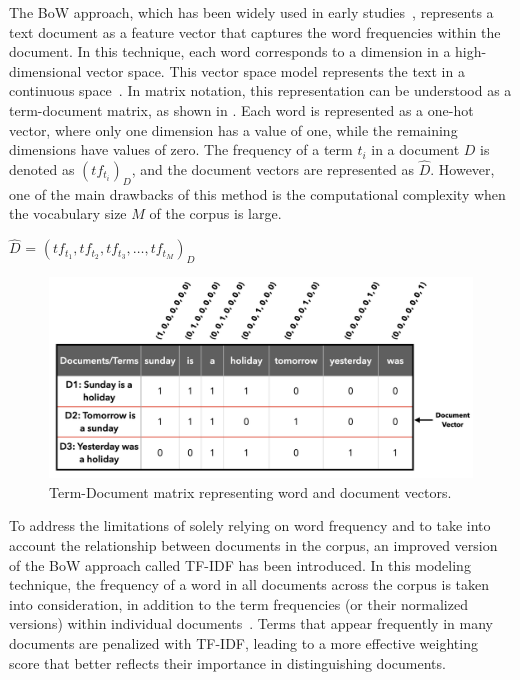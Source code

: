 The \ac{BoW} approach, which has been widely used in early studies~\cite{zhao2017fuzzy, qader2019overview}, represents a text document as a feature vector that captures the word frequencies within the document. In this technique, each word corresponds to a dimension in a high-dimensional vector space. This vector space model represents the text in a continuous space~\cite{afzali2019text}. In matrix notation, this representation can be understood as a term-document matrix, as shown in . Each word is represented as a one-hot vector, where only one dimension has a value of one, while the remaining dimensions have values of zero. The frequency of a term $t_i$ in a document $D$ is denoted as $(tf_{t_i})_D$, and the document vectors are represented as $\hat{D}$. However, one of the main drawbacks of this method is the computational complexity when the vocabulary size $M$ of the corpus is large.

\centerline{$\hat{D}$ = $(tf_{t_1}, tf_{t_2}, tf_{t_3},\dots, tf_{t_M})_D$ }

\begin{figure}[h!]
	\centering
	\includegraphics[width=.9\textwidth]{images/thesis_images/term_document_matrix.png}
	\caption[Term-Document matrix example.]{Term-Document matrix representing word and document vectors. \label{fig:td_matrix}}
\end{figure}


To address the limitations of solely relying on word frequency and to take into account the relationship between documents in the corpus, an improved version of the \ac{BoW} approach called \ac{TF-IDF} has been introduced. In this modeling technique, the frequency of a word in all documents across the corpus is taken into consideration, in addition to the term frequencies (or their normalized versions) within individual documents~\cite{lavin2019analyzing}. Terms that appear frequently in many documents are penalized with \ac{TF-IDF}, leading to a more effective weighting score that better reflects their importance in distinguishing documents.

